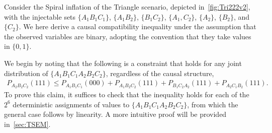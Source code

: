 {%


\bigskip

\smallskip\nobreak



Consider the Spiral inflation of the Triangle scenario, depicted in~\cref{fig:Tri222v2}, with the injectable sets $\{A_1 B_1 C_1\}$, $\{A_1 B_2\}$, $\{B_1 C_2\}$, $\{ A_1, C_2\}$, $\{A_2\}$, $\{B_2\}$, and $\{C_2\}$.
We here derive a causal compatibility inequality under the assumption that the observed variables are binary, adopting the convention that they take values in $\{0,1\}$.

We begin by noting that the following is a constraint that holds for any joint distribution of $\{A_1 B_1 C_1 A_2 B_2 C_2\}$, regardless of the causal structure, 
\begin{align}\label{eq:FritzF3raw}
	P_{A_2 B_2 C_2}(111) \leq P_{A_1 B_1 C_1}(000) + P_{A_1 B_2 C_2}(111) + P_{B_1 C_2 A_2}(111) + P_{A_2  C_1 B_2}(111).
\end{align}
To prove this claim, it suffices to check that the inequality holds for each of the $2^6$ deterministic assignments of values to $\{A_1 B_1 C_1 A_2 B_2 C_2\}$, from which the general case follows by linearity.  A more intuitive proof will be provided in~\cref{sec:TSEM}.

}
